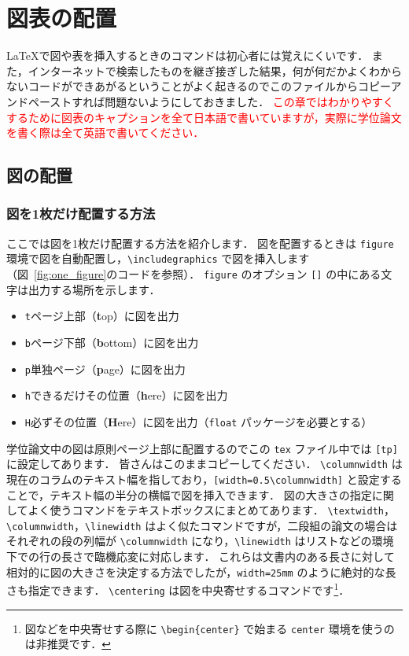 \chapter{図表の配置}
\label{ch:figure_table}

\LaTeX で図や表を挿入するときのコマンドは初心者には覚えにくいです．
また，インターネットで検索したものを継ぎ接ぎした結果，何が何だかよくわからないコードができあがるということがよく起きるのでこのファイルからコピーアンドペーストすれば問題ないようにしておきました．
\textcolor{red}{この章ではわかりやすくするために図表のキャプションを全て日本語で書いていますが，実際に学位論文を書く際は全て英語で書いてください．}

\section{図の配置}
\label{sec:figure}

\subsection{図を1枚だけ配置する方法}
\label{ssec:figure_sigle}

ここでは図を1枚だけ配置する方法を紹介します．
図を配置するときは \verb|figure| 環境で図を自動配置し，\verb|\includegraphics| で図を挿入します（図~\ref{fig:one_figure}のコードを参照）．
\verb|figure| のオプション \verb|[]| の中にある文字は出力する場所を示します．
\begin{itemize}
    \item \verb|t|\quad ページ上部（\textbf{t}op）に図を出力
    \item \verb|b|\quad ページ下部（\textbf{b}ottom）に図を出力
    \item \verb|p|\quad 単独ページ（\textbf{p}age）に図を出力
    \item \verb|h|\quad できるだけその位置（\textbf{h}ere）に図を出力
    \item \verb|H|\quad 必ずその位置（\textbf{H}ere）に図を出力（\verb|float| パッケージを必要とする）
\end{itemize}
学位論文中の図は原則ページ上部に配置するのでこの \verb|tex| ファイル中では \verb|[tp]| に設定してあります．
皆さんはこのままコピーしてください．
\verb|\columnwidth| は現在のコラムのテキスト幅を指しており，\verb|[width=0.5\columnwidth]| と設定することで，テキスト幅の半分の横幅で図を挿入できます．
図の大きさの指定に関してよく使うコマンドをテキストボックスにまとめてあります．
\verb|\textwidth|，\verb|\columnwidth|，\verb|\linewidth| はよく似たコマンドですが，二段組の論文の場合はそれぞれの段の列幅が \verb|\columnwidth| になり，\verb|\linewidth| はリストなどの環境下での行の長さで臨機応変に対応します．
これらは文書内のある長さに対して相対的に図の大きさを決定する方法でしたが，\verb|width=25mm| のように絶対的な長さも指定できます．
\verb|\centering| は図を中央寄せするコマンドです\footnote{図などを中央寄せする際に \texttt{\textbackslash begin\{center\}} で始まる \texttt{center} 環境を使うのは非推奨です．}．

